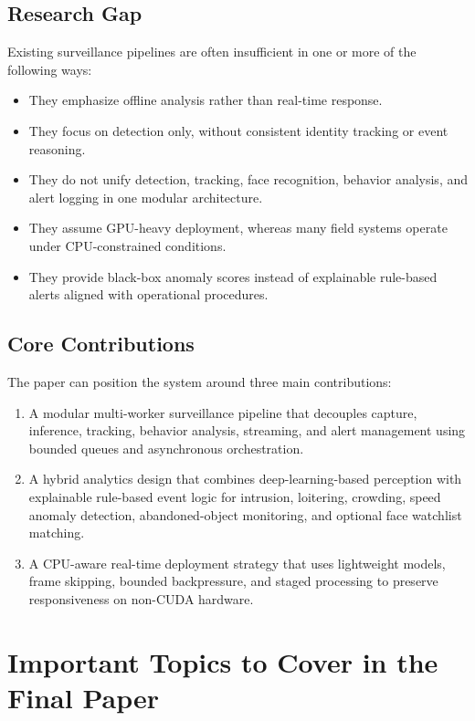 \documentclass[11pt]{article}
\begin{document}
\subsection{Research Gap}
Existing surveillance pipelines are often insufficient in one or more of the following ways:

\begin{itemize}
\item They emphasize offline analysis rather than real-time response.
\item They focus on detection only, without consistent identity tracking or event reasoning.
\item They do not unify detection, tracking, face recognition, behavior analysis, and alert logging in one modular architecture.
\item They assume GPU-heavy deployment, whereas many field systems operate under CPU-constrained conditions.
\item They provide black-box anomaly scores instead of explainable rule-based alerts aligned with operational procedures.
\end{itemize}

\subsection{Core Contributions}
The paper can position the system around three main contributions:

\begin{enumerate}
\item A modular multi-worker surveillance pipeline that decouples capture, inference, tracking, behavior analysis, streaming, and alert management using bounded queues and asynchronous orchestration.
\item A hybrid analytics design that combines deep-learning-based perception with explainable rule-based event logic for intrusion, loitering, crowding, speed anomaly detection, abandoned-object monitoring, and optional face watchlist matching.
\item A CPU-aware real-time deployment strategy that uses lightweight models, frame skipping, bounded backpressure, and staged processing to preserve responsiveness on non-CUDA hardware.
\end{enumerate}

\section{Important Topics to Cover in the Final Paper}
\end{document}
